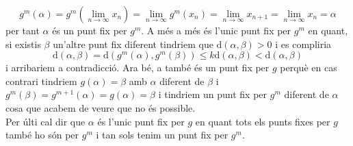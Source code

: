 \documentclass[a4paper,10pt]{article}
\renewcommand{\*}{\cdot}
\renewcommand{\d}{\text{d}}
\renewcommand{\a}{\alpha}
\renewcommand{\b}{\beta}
\begin{document}
\begin{equation*}
g^m(\a)=g^m(\lim\limits_{n\to\infty}x_n)=\lim\limits_{n\to\infty} g^m(x_n)=\lim\limits_{n\to\infty} x_{n+1}=\lim\limits_{n\to\infty} x_n=\a
\end{equation*}
per tant $\a$ és un punt fix per $g^m$. A més a més és l'unic punt fix per $g^m$ en quant, si existis $\beta$ un'altre punt fix diferent tindriem que $\d(\a,\beta)>0$ i es compliria
\begin{equation*}
\d(\a,\b)=\d(g^m(\a),g^m(\b))\le k\d(\a,\b)<\d(\a,\b)
\end{equation*}
i arribariem a contradicció. Ara bé, a també és un punt fix per $g$ perquè en cas contrari tindriem $g(\a)=\b$ amb $\a$ diferent de $\b$ i $g^m(\b)=g^{m+1}(\a)=g(\a)=\b$
i tindriem un punt fix per $g^m$ diferent de $\a$ cosa que acabem de veure que no és possible.\\
Per últi cal dir que $\a$ és l'unic punt fix per $g$ en quant tots els punts fixes per $g$ també ho són per $g^m$ i tan sols tenim un punt fix per $g^m$.
\end{document}
